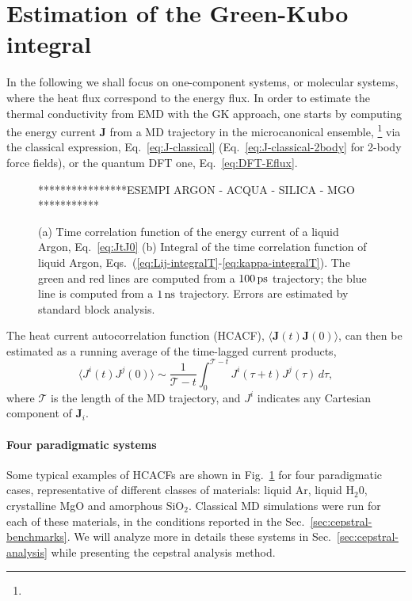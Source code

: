 \section{Estimation of the Green-Kubo integral} \label{sec:data-analysis-methods}

\begin{LEtext}
In the following we shall focus on one-component systems, or molecular systems, where the heat flux correspond to the energy flux. 
In order to estimate the thermal conductivity from EMD with the GK approach, one starts by computing the energy current $\mathbf{J}$ from a MD trajectory in the microcanonical ensemble,
\footnote{} 
via the classical expression, Eq.~\eqref{eq:J-classical} (Eq.~\eqref{eq:J-classical-2body} for 2-body force fields), or the quantum DFT one, Eq.~\eqref{eq:DFT-Eflux}.

\begin{figure}
    \begin{center}
    ****************ESEMPI ARGON - ACQUA - SILICA - MGO ***********
    \end{center}
	\caption{(a) Time correlation function of the energy current of a liquid Argon, Eq.~\eqref{eq:JtJ0}
    (b) Integral of the time correlation function of liquid Argon, Eqs.~(\ref{eq:Lij-integralT}-\ref{eq:kappa-integralT}).
    The green and red lines are computed from a $100\,\mathrm{ps}$ trajectory; the blue line is computed from a $1\,\mathrm{ns}$ trajectory.
    Errors are estimated by standard block analysis.} \label{fig:acf-examples}
\end{figure}

The heat current autocorrelation function (HCACF), $\langle\mathbf{J}(t)\mathbf{J}(0)\rangle$, can then be estimated as a running average of the time-lagged current products, 
\begin{equation}
    \langle J^i(t) J^j(0)\rangle \sim \frac{1}{\mathcal{T}-t} \int_0^{\mathcal{T}-t} J^i(\tau+t) J^j(\tau) \, d\tau , \label{eq:JtJ0}
\end{equation}
where $\mathcal{T}$ is the length of the MD trajectory, and $J^i$ indicates any Cartesian component of $\mathbf{J}_i$.

\paragraph{Four paradigmatic systems}
Some typical examples of HCACFs are shown in Fig.~\ref{fig:acf-examples} for four paradigmatic cases, representative of different classes of materials: liquid Ar, liquid H$_2$0, crystalline MgO and amorphous SiO$_2$. Classical MD simulations were run for each of these materials, in the conditions reported in the Sec.~\ref{sec:cepstral-benchmarks}. 
We will analyze more in details these systems in Sec.~\ref{sec:cepstral-analysis} while presenting the cepstral analysis method. 


\end{LEtext}
